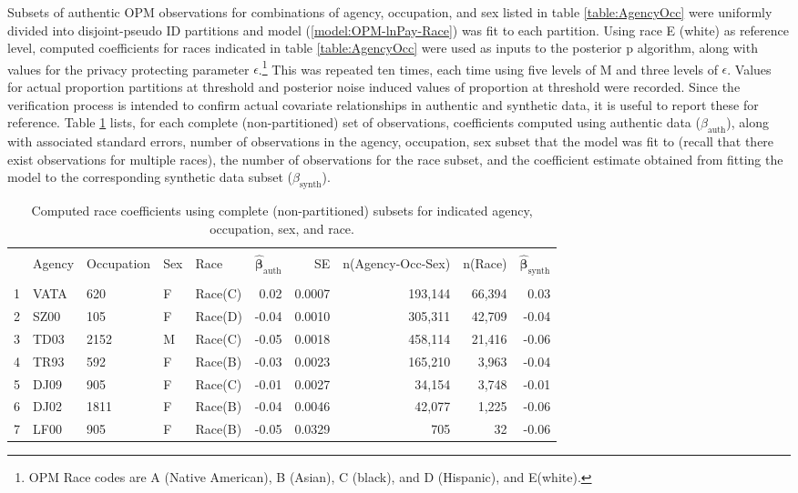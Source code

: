 \documentclass[10pt, letterpaper]{article}
\newcommand{\mest}[1]{\hat{\bm{#1}}}
\begin{document}
\begin{spacing}{1.0}
Subsets of authentic OPM observations for combinations of agency, occupation, and sex listed in table \ref{table:AgencyOcc} were uniformly divided into disjoint-pseudo ID partitions and model (\ref{model:OPM-lnPay-Race}) was fit to each partition.  Using race E (white) as reference level, computed coefficients for races indicated in table \ref{table:AgencyOcc} were used as inputs to the posterior p algorithm, along with values for the privacy protecting parameter $\epsilon$.\footnote{OPM Race codes are A (Native American), B (Asian), C (black), and D (Hispanic), and E(white).}  This was repeated ten times, each time using five levels of M and three levels of $\epsilon$.  Values for actual proportion partitions at threshold and posterior noise induced values of proportion at threshold were recorded.  Since the verification process is intended to confirm actual covariate relationships in authentic and synthetic data, it is useful to report these for reference.  Table \ref{table:CoefficientFullSet} lists, for each complete (non-partitioned) set of observations, coefficients computed using authentic data ($\beta_\text{auth}$), along with associated standard errors, number of observations in the agency, occupation, sex subset that the model was fit to (recall that there exist observations for multiple races), the number of observations for the race subset, and the coefficient estimate obtained from fitting the model to the corresponding synthetic data subset ($\beta_\text{synth}$).

\begin{table}[h]
    \centering
    \caption{Computed race coefficients using complete (non-partitioned) subsets for indicated agency, occupation, sex, and race.}
    \begin{tabular}{rllllrrrrr}
        \hline\\[-10pt]
        & Agency & Occupation & Sex & Race & $\mest{\beta}_\text{auth}$ & SE & n(Agency-Occ-Sex) & n(Race) & $\mest{\beta}_\text{synth}$ \\ 
        \hline\\[-6pt]
        1 & VATA & 620 & F & Race(C) & 0.02 & 0.0007 & 193,144 & 66,394 & 0.03 \\ 
        2 & SZ00 & 105 & F & Race(D) & -0.04 & 0.0010 & 305,311 & 42,709 & -0.04 \\ 
        3 & TD03 & 2152 & M & Race(C) & -0.05 & 0.0018 & 458,114 & 21,416 & -0.06 \\ 
        4 & TR93 & 592 & F & Race(B) & -0.03 & 0.0023 & 165,210 & 3,963 & -0.04 \\ 
        5 & DJ09 & 905 & F & Race(C) & -0.01 & 0.0027 & 34,154 & 3,748 & -0.01 \\ 
        6 & DJ02 & 1811 & F & Race(B) & -0.04 & 0.0046 & 42,077 & 1,225 & -0.06 \\ 
        7 & LF00 & 905 & F & Race(B) & -0.05 & 0.0329 & 705 & 32 & -0.06 \\ 
        \hline
    \end{tabular}
    \label{table:CoefficientFullSet}
\end{table}


\end{spacing}
\end{document}
